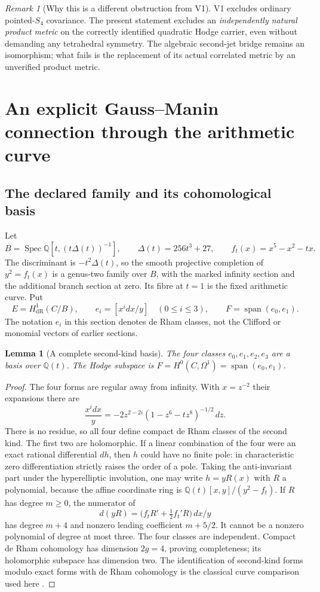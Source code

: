 \documentclass[11pt]{article}
\newtheorem{lemma}[lemma]{Lemma}
\theoremstyle{definition}
\theoremstyle{remark}
\newtheorem{remark}[remark]{Remark}
\newcommand{\Q}{\mathbb Q}
\newcommand{\Span}{\operatorname{span}}
\begin{document}
\begin{remark}[Why this is a different obstruction from V1]
V1 excludes ordinary pointed-$S_4$ covariance. The present statement excludes
an \emph{independently natural product metric} on the correctly identified
quadratic Hodge carrier, even without demanding any tetrahedral symmetry.
The algebraic second-jet bridge remains an isomorphism; what fails is the
replacement of its actual correlated metric by an unverified product metric.
\end{remark}

\section{An explicit Gauss--Manin connection through the arithmetic curve}
\label{sec:v7-GM}

\subsection{The declared family and its cohomological basis}
Let
\begin{equation}
 B=\operatorname{Spec}\Q[t,(t\Delta(t))^{-1}],\qquad
 \Delta(t)=256t^3+27,\qquad f_t(x)=x^5-x^2-tx.
 \label{eq:v7-base}
\end{equation}
The discriminant is $-t^2\Delta(t)$, so the smooth projective completion of
$y^2=f_t(x)$ is a genus-two family over $B$, with the marked infinity
section and the additional branch section at zero. Its fibre at $t=1$ is the
fixed arithmetic curve. Put
\[
 E=H^1_{\mathrm{dR}}(C/B),\qquad
 e_i=[x^i dx/y]\quad(0\le i\le3),\qquad
 F=\Span(e_0,e_1).
\]
The notation $e_i$ in this section denotes de Rham classes, not the Clifford
or monomial vectors of earlier sections.

\begin{lemma}[A complete second-kind basis]
\label{lem:v7-basis}
The four classes $e_0,e_1,e_2,e_3$ are a basis over $\Q(t)$. The Hodge
subspace is $F=H^0(C,\Omega^1)=\Span(e_0,e_1)$.
\end{lemma}
\begin{proof}
The four forms are regular away from infinity. With $x=z^{-2}$ their
expansions there are
\[
 \frac{x^i dx}{y}
   =-2z^{2-2i}(1-z^6-tz^8)^{-1/2}\,dz.
\]
There is no residue, so all four define compact de Rham classes of the second
kind. The first two are holomorphic. If a linear combination of the four were
an exact rational differential $dh$, then $h$ could have no finite pole:
in characteristic zero differentiation strictly raises the order of a pole.
Taking the anti-invariant part under the hyperelliptic involution, one may
write $h=yR(x)$ with $R$ a polynomial, because the affine coordinate ring is
$\Q(t)[x,y]/(y^2-f_t)$. If $R$ has degree $m\ge0$, the numerator of
\[
 d(yR)=\bigl(f_tR'+\tfrac12f_t'R\bigr)\,dx/y
\]
has degree $m+4$ and nonzero leading coefficient $m+5/2$. It cannot be a
nonzero polynomial of degree at most three. The four classes are independent.
Compact de Rham cohomology has dimension $2g=4$, proving completeness;
its holomorphic subspace has dimension two. The identification of second-kind
forms modulo exact forms with de Rham cohomology is the classical curve
comparison used here \cite{KTdeRham}.
\end{proof}
\end{document}

